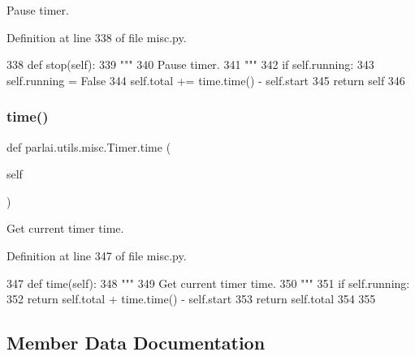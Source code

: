 \begin{DoxyVerb}Pause timer.
\end{DoxyVerb}
 

Definition at line 338 of file misc.\+py.


\begin{DoxyCode}
338     \textcolor{keyword}{def }stop(self):
339         \textcolor{stringliteral}{"""}
340 \textcolor{stringliteral}{        Pause timer.}
341 \textcolor{stringliteral}{        """}
342         \textcolor{keywordflow}{if} self.running:
343             self.running = \textcolor{keyword}{False}
344             self.total += time.time() - self.start
345         \textcolor{keywordflow}{return} self
346 
\end{DoxyCode}
\mbox{\label{classparlai_1_1utils_1_1misc_1_1Timer_a37214d0006ae44a19081c21a5a699ffb}} 
\subsubsection{\texorpdfstring{time()}{time()}}
{\footnotesize\ttfamily def parlai.\+utils.\+misc.\+Timer.\+time (\begin{DoxyParamCaption}\item[{}]{self }\end{DoxyParamCaption})}

\begin{DoxyVerb}Get current timer time.
\end{DoxyVerb}
 

Definition at line 347 of file misc.\+py.


\begin{DoxyCode}
347     \textcolor{keyword}{def }time(self):
348         \textcolor{stringliteral}{"""}
349 \textcolor{stringliteral}{        Get current timer time.}
350 \textcolor{stringliteral}{        """}
351         \textcolor{keywordflow}{if} self.running:
352             \textcolor{keywordflow}{return} self.total + time.time() - self.start
353         \textcolor{keywordflow}{return} self.total
354 
355 
\end{DoxyCode}


\subsection{Member Data Documentation}
\mbox{\label{classparlai_1_1utils_1_1misc_1_1Timer_a05abf50b49c1e26baabe03a9daafa870}} 
